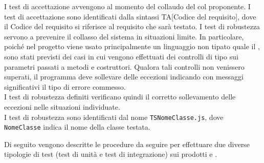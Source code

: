 				I test di accettazione avvengono al momento del collaudo del  col proponente.
				I test di accettazione sono identificati dalla sintassi TA[Codice del requisito], dove il Codice del requisito si riferisce al requisito che sarà testato.
				I test di robustezza servono a prevenire il collasso del sistema in situazioni limite. In particolare, poiché nel progetto viene usato principalmente un linguaggio non tipato quale il , sono stati previsti dei casi in cui vengono effettuati dei controlli di tipo sui parametri passati a metodi e costruttori. Qualora tali controlli non venissero superati, il programma deve sollevare delle eccezioni indicando con messaggi significativi il tipo di errore commesso.\\
				I test di robustezza definiti verificano quindi il corretto sollevamento delle eccezioni nelle situazioni individuate.\\
				I test di robustezza sono identificati dal nome \texttt{TSNomeClasse.js}, dove \texttt{NomeClasse} indica il nome della classe testata.
				
			 \label{sec:procedure}
			Di seguito vengono descritte le procedure da seguire per effettuare due diverse tipologie di test (test di unità e test di integrazione) sui prodotti \textit{} e \textit{}.
			
